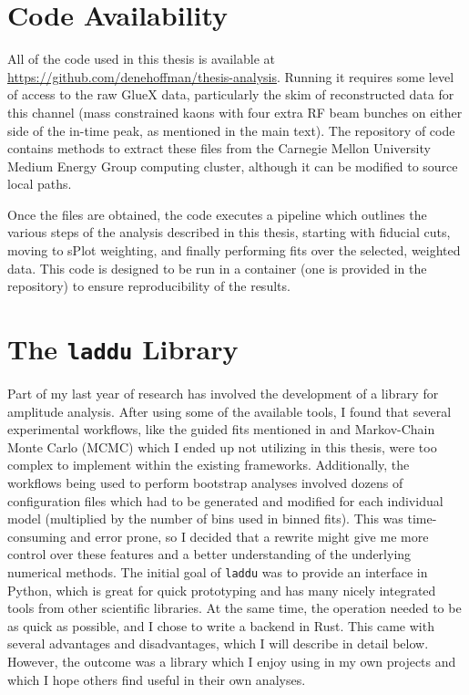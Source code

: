 \section{Code Availability}
All of the code used in this thesis is available at \url{https://github.com/denehoffman/thesis-analysis}. Running it requires some level of access to the raw GlueX data, particularly the skim of reconstructed data for this channel (mass constrained kaons with four extra RF beam bunches on either side of the in-time peak, as mentioned in the main text). The repository of code contains methods to extract these files from the Carnegie Mellon University Medium Energy Group computing cluster, although it can be modified to source local paths.

Once the files are obtained, the code executes a pipeline which outlines the various steps of the analysis described in this thesis, starting with fiducial cuts, moving to sPlot weighting, and finally performing fits over the selected, weighted data. This code is designed to be run in a container (one is provided in the repository) to ensure reproducibility of the results.

\section{The \texttt{laddu} Library}
Part of my last year of research has involved the development of a library for amplitude analysis. After using some of the available tools, I found that several experimental workflows, like the guided fits mentioned in  and Markov-Chain Monte Carlo (MCMC) which I ended up not utilizing in this thesis, were too complex to implement within the existing frameworks. Additionally, the workflows being used to perform bootstrap analyses involved dozens of configuration files which had to be generated and modified for each individual model (multiplied by the number of bins used in binned fits). This was time-consuming and error prone, so I decided that a rewrite might give me more control over these features and a better understanding of the underlying numerical methods. The initial goal of \texttt{laddu} was to provide an interface in Python, which is great for quick prototyping and has many nicely integrated tools from other scientific libraries. At the same time, the operation needed to be as quick as possible, and I chose to write a backend in Rust. This came with several advantages and disadvantages, which I will describe in detail below. However, the outcome was a library which I enjoy using in my own projects and which I hope others find useful in their own analyses.


